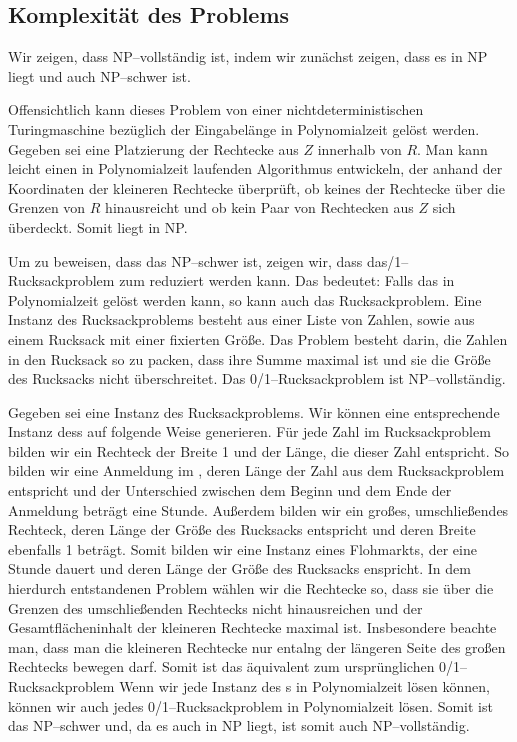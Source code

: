 \subsection{Komplexität des Problems}\label{sec:komplexitaet}


Wir zeigen, dass \fp{} NP--vollständig ist, indem wir zunächst zeigen, dass
es in NP liegt und auch NP--schwer ist.

Offensichtlich kann dieses Problem von einer nichtdeterministischen
Turingmaschine bezüglich der Eingabelänge in Polynomialzeit gelöst werden.
Gegeben sei eine Platzierung der Rechtecke aus $Z$ innerhalb von $R$. 
Man kann leicht einen in Polynomialzeit laufenden Algorithmus entwickeln, der
anhand der Koordinaten der kleineren Rechtecke überprüft, ob keines
der Rechtecke über die Grenzen von $R$ hinausreicht und ob
kein Paar von Rechtecken aus $Z$ sich überdeckt.  
Somit liegt \fp{} in NP.

Um zu beweisen, dass das \fp{} NP--schwer ist, zeigen wir, dass das/1--Rucksackproblem zum \fp{} reduziert werden kann.
Das bedeutet: Falls das\break \fp{} in Polynomialzeit gelöst werden kann,
so kann auch das Rucksackproblem.
Eine Instanz des Rucksackproblems besteht aus einer Liste von Zahlen,
sowie aus einem Rucksack mit einer fixierten Größe.
Das Problem besteht darin, die Zahlen in den Rucksack 
so zu packen, dass ihre Summe maximal ist und sie die Größe des Rucksacks nicht überschreitet.
Das 0/1--Rucksackproblem ist NP--vollständig.\cite{knapsack}


Gegeben sei eine Instanz des Rucksackproblems.
Wir können eine entsprechende Instanz des\break \fp s auf folgende Weise generieren.
Für jede Zahl im Rucksackproblem bilden wir ein Rechteck der Breite 1 und der Länge, die 
dieser Zahl entspricht.
So bilden wir eine Anmeldung im \fp{}, deren Länge der
Zahl aus dem Rucksackproblem entspricht und der Unterschied zwischen
dem Beginn und dem Ende der Anmeldung beträgt eine Stunde.
Außerdem bilden wir ein großes, umschließendes Rechteck, deren Länge der Größe des Rucksacks entspricht
und deren Breite ebenfalls 1 beträgt.
Somit bilden wir eine Instanz eines Flohmarkts, der eine Stunde dauert und deren 
Länge der Größe des Rucksacks enspricht.
In dem hierdurch entstandenen Problem wählen wir die Rechtecke so, 
dass sie über die Grenzen des umschließenden Rechtecks nicht hinausreichen
und der Gesamtflächeninhalt der kleineren Rechtecke maximal ist. 
Insbesondere beachte man, dass man die kleineren Rechtecke nur entalng der längeren
Seite des großen Rechtecks bewegen darf.
Somit ist das \fp{} äquivalent zum ursprünglichen 0/1--Rucksackproblem
Wenn wir jede Instanz des \fp s in Polynomialzeit lösen können,
können wir auch jedes 0/1--Rucksackproblem in Polynomialzeit lösen.
Somit ist das \fp{} NP--schwer und, da es auch in NP liegt, 
ist somit auch NP--vollständig.


